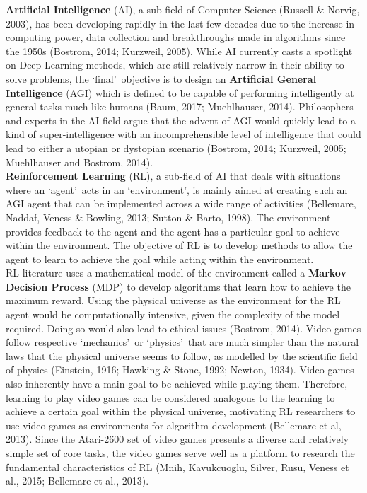 \textbf{Artificial Intelligence} (AI), a sub-field of Computer Science (Russell \& Norvig, 2003), has been developing rapidly in the last few decades due to the increase in computing power, data collection and breakthroughs made in algorithms since the 1950s (Bostrom, 2014; Kurzweil, 2005). While AI currently casts a spotlight on Deep Learning methods, which are still relatively narrow in their ability to solve problems, the \lq final\rq \ objective is to design an \textbf{Artificial General Intelligence} (AGI) which is defined to be capable of performing intelligently at general tasks much like humans (Baum, 2017; Muehlhauser, 2014). Philosophers and experts in the AI field argue that the advent of AGI would quickly lead to a kind of super-intelligence with an incomprehensible level of intelligence that could lead to either a utopian or dystopian scenario (Bostrom, 2014; Kurzweil, 2005; Muehlhauser and Bostrom, 2014). 
\\
\textbf{Reinforcement Learning} (RL), a sub-field of AI that deals with situations where an \lq agent\rq \ acts in an \lq environment\rq , is mainly aimed at creating such an AGI agent that can be implemented across a wide range of activities (Bellemare, Naddaf, Veness \& Bowling, 2013; Sutton \& Barto, 1998). The environment provides feedback to the agent and the agent has a particular goal to achieve within the environment. The objective of RL is to develop methods to allow the agent to learn to achieve the goal while acting within the environment.
\\
RL literature uses a mathematical model of the environment called a \textbf{Markov Decision Process} (MDP) to develop algorithms that learn how to achieve the maximum reward. Using the physical universe as the environment for the RL agent would be computationally intensive, given the complexity of the model required. Doing so would also lead to ethical issues (Bostrom, 2014). Video games follow respective \lq mechanics\rq \ or \lq physics\rq \ that are much simpler than the natural laws that the physical universe seems to follow, as modelled by the scientific field of physics (Einstein, 1916; Hawking \& Stone, 1992; Newton, 1934). Video games also inherently have a main goal to be achieved while playing them. Therefore, learning to play video games can be considered analogous to the learning to achieve a certain goal within the physical universe, motivating RL researchers to use video games as environments for algorithm development (Bellemare et al, 2013). Since the Atari-2600 set of video games presents a diverse and relatively simple set of core tasks, the video games serve well as a platform to research the fundamental characteristics of RL (Mnih, Kavukcuoglu, Silver, Rusu, Veness et al., 2015; Bellemare et al., 2013). 
